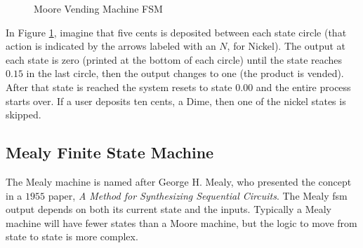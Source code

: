 \begin{figure}[H]
  \caption{Moore Vending Machine FSM}
  \label{SIM:fig:moore_vending_machine_fsm}
  \myfloatalign
\end{figure}

In Figure \ref{SIM:fig:moore_vending_machine_fsm}, imagine that five cents is deposited between each state circle (that action is indicated by the arrows labeled with an $ N $, for Nickel). The output at each state is zero (printed at the bottom of each circle) until the state reaches $ 0.15 $ in the last circle, then the output changes to one (the product is vended). After that state is reached the system resets to state $ 0.00 $ and the entire process starts over. If a user deposits ten cents, a Dime, then one of the nickel states is skipped.

\subsection{Mealy Finite State Machine}
\label{SIM:subsec:mealy_finite_state_machines}

The Mealy machine is named after George H. Mealy, who presented the concept in a $ 1955 $ paper, \emph{A Method for Synthesizing Sequential Circuits}. The Mealy \gls{fsm} output depends on both its current state and the inputs. Typically a Mealy machine will have fewer states than a Moore machine, but the logic to move from state to state is more complex. 


